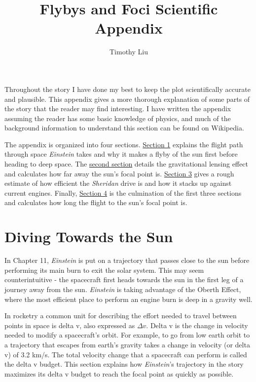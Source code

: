 \documentclass[12pt]{article} %
\title{Flybys and Foci Scientific Appendix}
\author{Timothy Liu}
\begin{document}
\maketitle


Throughout the story I have done my best to keep the plot scientifically accurate and plausible. This appendix gives a more thorough explanation of some parts of the story that the reader may find interesting. I have written the appendix assuming the reader has some basic knowledge of physics, and much of the background information to understand this section can be found on Wikipedia.

The appendix is organized into four sections. \hyperref[sec:diving]{Section 1} explains the flight path through space \textit{Einstein} takes and why it makes a flyby of the sun first before heading to deep space. The \hyperref[sec:lensing]{second section} details the gravitational lensing effect and calculates how far away the sun's focal point is. \hyperref[sec:efficiency]{Section 3} gives a rough estimate of how efficient the \textit{Sheridan} drive is and how it stacks up against current engines. Finally, \hyperref[sec:flighttime]{Section 4} is the culmination of the first three sections and calculates how long the flight to the sun's focal point is.

\newpage
\tableofcontents
\newpage

\section{Diving Towards the Sun}
\label{sec:diving}

In Chapter 11, \textit{Einstein} is put on a trajectory that passes close to the sun before performing its main burn to exit the solar system. This may seem counterintuitive - the spacecraft first heads towards the sun in the first leg of a journey away from the sun. \textit{Einstein} is taking advantage of the Oberth Effect, where the most efficient place to perform an engine burn is deep in a gravity well.

In rocketry a common unit for describing the effort needed to travel between points in space is delta v, also expressed as $\Delta v$. Delta v is the change in velocity needed to modify a spacecraft's orbit. For example, to go from low earth orbit to a trajectory that escapes from earth's gravity takes a change in velocity (or delta v) of 3.2 km/s. The total velocity change that a spacecraft can perform is called the delta v budget. This section explains how \textit{Einstein}'s trajectory in the story maximizes its delta v budget to reach the focal point as quickly as possible.
\end{document}
